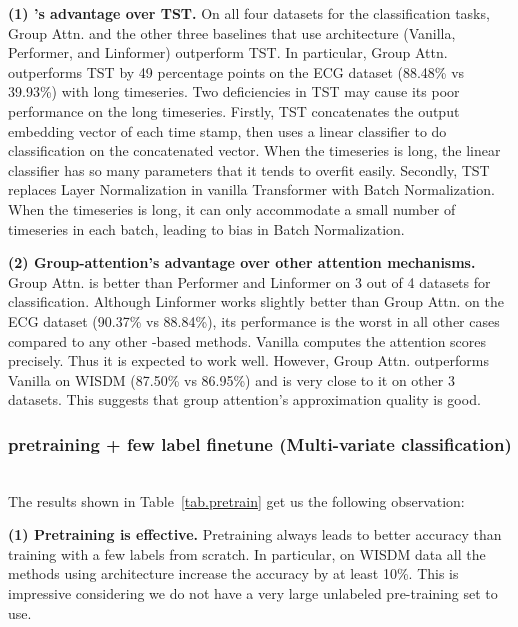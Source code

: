\textbf{(1) \system's advantage over TST.} On all four datasets for the classification tasks,  Group Attn. and the other three baselines that use \system architecture (Vanilla, Performer, and Linformer) outperform TST. In particular, Group Attn. outperforms TST by 49 percentage points on the ECG dataset (88.48\% vs 39.93\%) with long timeseries.
Two deficiencies in TST may cause its poor performance on the long timeseries. Firstly, TST concatenates the output embedding vector of each time stamp, then uses a linear classifier to do classification on the concatenated vector. When the timeseries is long, the linear classifier has so many parameters that it tends to overfit easily. Secondly, TST replaces Layer Normalization in vanilla Transformer with Batch Normalization. 
When the timeseries is long, it can only accommodate a small number of timeseries in each batch, leading to bias in Batch Normalization.

\textbf{(2) Group-attention's advantage over other attention mechanisms.} 
Group Attn. is better than Performer and Linformer on 3 out of 4 datasets for classification. Although Linformer works slightly better than Group Attn. on the ECG dataset (90.37\% vs 88.84\%), its performance is the worst in all other cases compared to any other \system-based methods.
Vanilla computes the attention scores precisely. Thus it is expected to work well. However, Group Attn. outperforms Vanilla on WISDM (87.50\% vs 86.95\%) and is very close to it on other 3 datasets.
This suggests that group attention's approximation quality is good.


\subsubsection{pretraining + few label finetune (Multi-variate classification)\nopunct}\ \\
The results shown in Table~\ref{tab.pretrain} get us the following observation: 

\textbf{(1) Pretraining is effective.} Pretraining always leads to better accuracy than training with a few labels from scratch. In particular, on WISDM data all the methods using \system architecture increase the accuracy by at least 10\%. This is impressive considering we do not have a very large unlabeled pre-training set to use.

